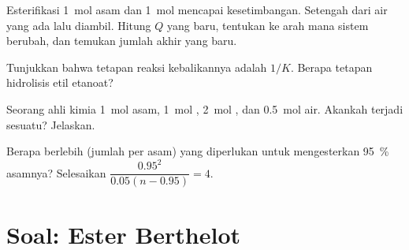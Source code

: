 \begin{exercise}[$\star\star\star$]\label{exo:g12:equilibrium:12}
Esterifikasi \qty{1}{mol} asam dan \qty{1}{mol}  mencapai
kesetimbangan. Setengah dari air yang ada lalu diambil. Hitung $Q$ yang
baru, tentukan ke arah mana sistem berubah, dan temukan jumlah akhir
 yang baru.
\end{exercise}

\begin{exercise}[$\star\star\star$]\label{exo:g12:equilibrium:13}
Tunjukkan bahwa tetapan reaksi kebalikannya adalah $1/K$. Berapa tetapan
hidrolisis etil etanoat?
\end{exercise}

\begin{exercise}[$\star\star\star$]\label{exo:g12:equilibrium:14}
Seorang ahli kimia  \qty{1}{mol} asam, \qty{1}{mol} ,
\qty{2}{mol} , dan \qty{0.5}{mol} air. Akankah terjadi sesuatu?
Jelaskan.
\end{exercise}

\begin{exercise}[$\star\star\star$]\label{exo:g12:equilibrium:15}
Berapa  berlebih (jumlah per  asam) yang diperlukan untuk
mengesterkan \qty{95}{\percent} asamnya? Selesaikan
$\dfrac{0.95^2}{0.05(n - 0.95)} =
4$.
\end{exercise}

\section{Soal: Ester Berthelot}

